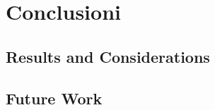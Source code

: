 
\chapter{Conclusioni}\label{conclusioni} %





\section{Results and Considerations}
\section{Future Work}
 

